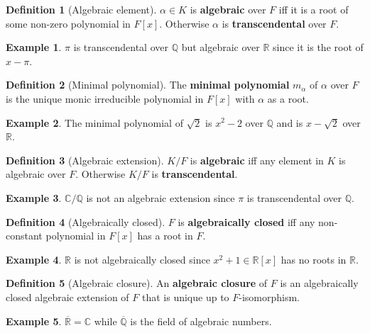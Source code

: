 \documentclass{article}
\newcommand{\Q}{\mathbb{Q}}
\newcommand{\R}{\mathbb{R}}
\newcommand{\C}{\mathbb{C}}
\renewcommand{\sb}[1]{\left[ #1 \right]}
\theoremstyle{definition}
\newtheorem*{definition}{Definition}
\newtheorem*{example}{Example}
\begin{document}
\begin{definition}[Algebraic element]
$ \alpha \in K $ is \textbf{algebraic} over $ F $ iff it is a root of some non-zero polynomial in $ F\sb{x} $. Otherwise $ \alpha $ is \textbf{transcendental} over $ F $.
\end{definition}

\begin{example}
$ \pi $ is transcendental over $ \Q $ but algebraic over $ \R $ since it is the root of $ x - \pi $.
\end{example}

\begin{definition}[Minimal polynomial]
The \textbf{minimal polynomial} $ m_\alpha $ of $ \alpha $ over $ F $ is the unique monic irreducible polynomial in $ F\sb{x} $ with $ \alpha $ as a root.
\end{definition}

\begin{example}
The minimal polynomial of $ \sqrt{2} $ is $ x^2 - 2 $ over $ \Q $ and is $ x - \sqrt{2} $ over $ \R $.
\end{example}

\begin{definition}[Algebraic extension]
$ K / F $ is \textbf{algebraic} iff any element in $ K $ is algebraic over $ F $. Otherwise $ K / F $ is \textbf{transcendental}.
\end{definition}

\begin{example}
$ \C / \Q $ is not an algebraic extension since $ \pi $ is transcendental over $ \Q $.
\end{example}

\begin{definition}[Algebraically closed]
$ F $ is \textbf{algebraically closed} iff any non-constant polynomial in $ F\sb{x} $ has a root in $ F $.
\end{definition}

\begin{example}
$ \R $ is not algebraically closed since $ x^2 + 1 \in \R\sb{x} $ has no roots in $ \R $.
\end{example}

\begin{definition}[Algebraic closure]
An \textbf{algebraic closure} of $ F $ is an algebraically closed algebraic extension of $ F $ that is unique up to $ F $-isomorphism.
\end{definition}

\begin{example}
$ \overline{\R} = \C $ while $ \overline{\Q} $ is the field of algebraic numbers.
\end{example}
\end{document}
